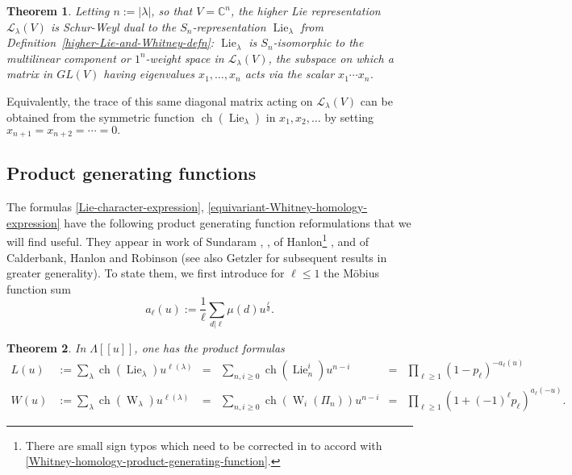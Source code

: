 \documentclass[12pt]{amsart}
\theoremstyle{plain}
\newtheorem{thm}{Theorem}[section]
\theoremstyle{definition}
\begin{document}
\begin{thm}
Letting $n:=|\lambda|$, so that $V={{\mathbb C}}^n$,
the higher Lie representation ${{\mathcal{L}}}_\lambda(V)$
is {\it Schur-Weyl dual} to 
the $S_n$-representation ${{\operatorname{Lie}}}_\lambda$
from Definition~\ref{higher-Lie-and-Whitney-defn}:
${{\operatorname{Lie}}}_\lambda$ is $S_n$-isomorphic to the {\it multilinear component} 
or {\it $1^n$-weight space} in ${{\mathcal{L}}}_\lambda(V)$, the subspace on which a matrix in $GL(V)$ 
having eigenvalues $x_1,\ldots,x_n$ acts via the scalar $x_1 \cdots x_n$.  
\end{thm}

Equivalently, the trace of this same diagonal matrix acting on ${{\mathcal{L}}}_\lambda(V)$ 
can be obtained from the symmetric function ${{\operatorname{ch}}}({{\operatorname{Lie}}}_\lambda)$
in $x_1,x_2,\ldots$ by setting $x_{n+1}=x_{n+2}= \cdots =0.$ 

\subsection{Product generating functions}

The formulas \eqref{Lie-character-expression}, 
\eqref{equivariant-Whitney-homology-expression} have
the following product generating function reformulations
that we will find useful.  They appear
in work of Sundaram \cite[p. 249]{Sundaram},
\cite[Lemma 3.12]{Sundaram-Jerusalem},
of Hanlon\footnote{There are small 
sign typos which need  to be corrected in \cite[Eqn. (8.1)]{HanlonHodge} to
accord with \eqref{Whitney-homology-product-generating-function}.}  
\cite[Eqn. (8.1)]{HanlonHodge}, and of
Calderbank, Hanlon and Robinson \cite[Cor. 4.4]{CalderbankHanlonRobinson} 
(see also Getzler \cite[Thm. 4.5]{Getzler} for subsequent results 
in greater generality). 
To state them,  we first introduce for $\ell \leq 1$ the M\"obius function sum
\begin{equation}
\label{mobius-gf}
a_{\ell}(u):={\displaystyle\frac{1}{\ell} 
             \sum_{d | \ell} \mu(d) u^{\frac{\ell}{d}}}. 
\end{equation}

\begin{thm}
\label{product-generating-functions}
In $\Lambda[[u]]$, one has the product formulas
\begin{align}
L(u) &:= \displaystyle\sum_\lambda {{\operatorname{ch}}}({{\operatorname{Lie}}}_\lambda) u^{\ell(\lambda)}
    &=&\displaystyle\sum_{n,i \geq 0} {{\operatorname{ch}}}({{\operatorname{Lie}}}^i_n) u^{n-i} 
   &=& \displaystyle\prod_{\ell \geq 1} 
   \left( 
     1 - p_\ell 
   \right)^{-a_\ell(u)} 
\label{Lie-product-generating-function} \\
\displaystyle
W(u) &:= \displaystyle\sum_\lambda {{\operatorname{ch}}}({{\operatorname{W}}}_\lambda) u^{\ell(\lambda)}
     &=& \displaystyle\sum_{n,i \geq 0} {{\operatorname{ch}}}({{\operatorname{W}}}_i(\Pi_n)) u^{n-i} 
&=& \displaystyle\prod_{\ell \geq 1} 
   \left( 
     1 + (-1)^\ell p_\ell 
   \right)^{a_\ell(-u)}. 
\label{Whitney-homology-product-generating-function}
\end{align}
\end{thm}
\end{document}
